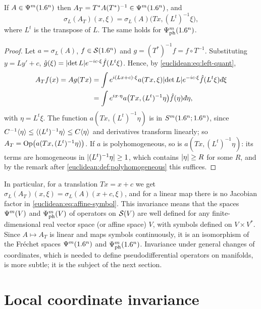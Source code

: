 \begin{proposition}\label{euclidean:prop:affine}
  If $A\in\Psi^{m}(1.6^n)$ then $A_T=T^*A(T^*)^{-1}\in\Psi^{m}(1.6^n)$, and
  \begin{equation}\label{euclidean:eq:affine-symbol}
    \sigma_L(A_T)(x,\xi)=\sigma_L(A)\bigl(Tx,(L^t)^{-1}\xi\bigr),
  \end{equation}
  where $L^t$ is the transpose of $L$. The same holds for
  $\Psi^{m}_{\mathrm{ph}}(1.6^n)$.
\end{proposition}
\begin{proof}
  Let $a=\sigma_L(A)$, $f\in\mathcal{S}(1.6^n)$ and $g=(T^*)^{-1}f=f\circ T^{-1}$.
  Substituting $y=Ly'+c$,
  $\hat g(\xi)=\lvert \det L\rvert e^{-ic\cdot\xi}\hat f(L^t\xi)$. Hence, by
  \eqref{euclidean:eq:left-quant},
  \begin{align*}
    A_Tf(x)=Ag(Tx)&=\int e^{i(Lx+c)\cdot\xi}a(Tx,\xi)\abs{\det L}
    e^{-ic\cdot\xi}\hat f(L^t\xi)\,\dbar\xi\\
    &=\int e^{ix\cdot\eta}a\bigl(Tx,(L^t)^{-1}\eta\bigr)\hat f(\eta)\,\dbar\eta,
  \end{align*}
  with $\eta=L^t\xi$. The function $a(Tx,(L^t)^{-1}\eta)$ is in
  $S^m(1.6^n;1.6^n)$, since
  $C^{-1}\langle \eta\rangle\le\langle (L^t)^{-1}\eta\rangle\le C\langle \eta\rangle$ and derivatives
  transform linearly; so $A_T=\operatorname{Op}\bigl(a(Tx,(L^t)^{-1}\eta)\bigr)$. If $a$ is
  polyhomogeneous, so is $a(Tx,(L^t)^{-1}\eta)$: its terms are homogeneous in
  $\lvert (L^t)^{-1}\eta\rvert\ge1$, which contains $\lvert \eta\rvert\ge R$ for some $R$, and by
  the remark after \cref{euclidean:def:polyhomogeneous} this suffices.
\end{proof}

In particular, for a translation $Tx=x+c$ we get
$\sigma_L(A_T)(x,\xi)=\sigma_L(A)(x+c,\xi)$, and for a linear map there is no
Jacobian factor in \eqref{euclidean:eq:affine-symbol}. This invariance means
that the spaces $\Psi^{m}(V)$ and $\Psi^{m}_{\mathrm{ph}}(V)$ of operators on
$\mathcal{S}(V)$ are well defined for any finite-dimensional real vector space (or
affine space) $V$, with symbols defined on $V\times V^*$. Since $A\mapsto A_T$
is linear and maps symbols continuously, it is an isomorphism of the
Fr\'echet spaces $\Psi^{m}(1.6^n)$ and $\Psi^{m}_{\mathrm{ph}}(1.6^n)$.
Invariance under general changes of coordinates, which is needed to define
pseudodifferential operators on manifolds, is more subtle; it is the subject
of the next section.

\section{Local coordinate invariance}\label{euclidean:sec:coordinates}

